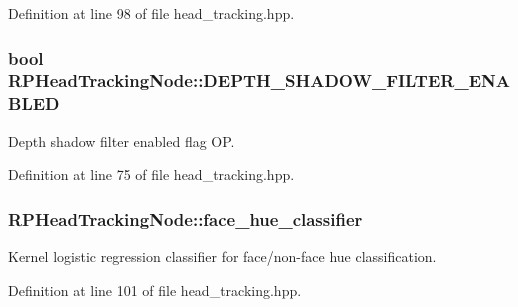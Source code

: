 \-Definition at line 98 of file head\-\_\-tracking.\-hpp.

\hypertarget{class_r_p_head_tracking_node_a70c083e7ca08af282d686198bd16a884}{
\subsubsection[{\-D\-E\-P\-T\-H\-\_\-\-S\-H\-A\-D\-O\-W\-\_\-\-F\-I\-L\-T\-E\-R\-\_\-\-E\-N\-A\-B\-L\-E\-D}]{\setlength{\rightskip}{0pt plus 5cm}bool {\bf \-R\-P\-Head\-Tracking\-Node\-::\-D\-E\-P\-T\-H\-\_\-\-S\-H\-A\-D\-O\-W\-\_\-\-F\-I\-L\-T\-E\-R\-\_\-\-E\-N\-A\-B\-L\-E\-D}}}\label{class_r_p_head_tracking_node_a70c083e7ca08af282d686198bd16a884}
\-Depth shadow filter enabled flag \-O\-P. 

\-Definition at line 75 of file head\-\_\-tracking.\-hpp.

\hypertarget{class_r_p_head_tracking_node_a9753532076085f324715162e3e1da2a6}{
\subsubsection[{face\-\_\-hue\-\_\-classifier}]{ {\bf \-R\-P\-Head\-Tracking\-Node\-::face\-\_\-hue\-\_\-classifier}}}\label{class_r_p_head_tracking_node_a9753532076085f324715162e3e1da2a6}
\-Kernel logistic regression classifier for face/non-\/face hue classification. 

\-Definition at line 101 of file head\-\_\-tracking.\-hpp.

